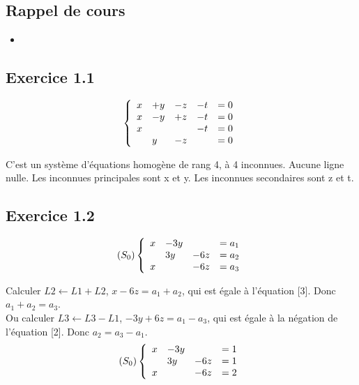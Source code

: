 \documentclass[]{book}
\theoremstyle{definition}
\begin{document}
\subsection*{Rappel de cours}

\begin{itemize}
\item 
\end{itemize}


\subsection*{Exercice 1.1}
$$
\left\{ 
\begin{array}{l l l l l}
  x & +y & -z & -t & = 0\\
  x & -y & +z & -t & = 0\\
  x &    &    & -t & = 0\\
    & y  & -z &    & = 0\\
\end{array}
\right. 
$$

C'est un syst\`eme d'\'equations homog\`ene de rang 4, \`a 4 inconnues. Aucune ligne nulle. Les inconnues principales sont x et y. Les inconnues secondaires sont z et t.


\subsection*{Exercice 1.2}
$$(S_0)
\left\{ 
\begin{array}{l l l l}
  x & -3y &     & = a_1 \\
    & 3y  & -6z & = a_2 \\
  x &     & -6z & = a_3 \\
\end{array}
\right. 
$$

Calculer $L2 \leftarrow L1 + L2$, $x - 6z = a_1+a_2$, qui est \'egale \`a l'\'equation [3]. Donc $a_1+a_2 = a_3$.\\
Ou calculer $L3 \leftarrow L3 - L1$, $-3y +6z = a_1-a_3$, qui est \'egale \`a la n\'egation de l'\'equation [2]. Donc $a_2 = a_3-a_1$.\\

$$(S_0)
\left\{ 
\begin{array}{l l l l}
  x & -3y &     & = 1 \\
    & 3y  & -6z & = 1 \\
  x &     & -6z & = 2 \\
\end{array}
\right. 
$$
\end{document}

